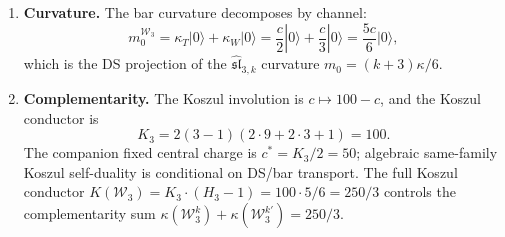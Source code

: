 \begin{theorem}
\begin{enumerate}[label=\textup{(\roman*)}]
\item \textbf{Curvature.} The bar curvature
 decomposes by channel:
 \[
 m_0^{\mathcal{W}_3} = \kappa_T |0\rangle + \kappa_W |0\rangle
 = \frac{c}{2}|0\rangle + \frac{c}{3}|0\rangle
 = \frac{5c}{6}|0\rangle,
 \]
 which is the DS projection of the $\widehat{\mathfrak{sl}}_{3,k}$
 curvature $m_0 = (k{+}3)\kappa/6$.

\item \textbf{Complementarity.}
 The Koszul involution is $c \mapsto 100 - c$,
 and the Koszul conductor is
 \[
 K_3 = 2(3{-}1)(2 \cdot 9 + 2 \cdot 3 + 1) = 100.
 \]
 The companion fixed central charge is $c^* = K_3/2 = 50$; algebraic
 same-family Koszul self-duality is conditional on DS/bar transport.
 The full Koszul conductor
 $K(\mathcal{W}_3) = K_3 \cdot (H_3 - 1) = 100 \cdot 5/6 = 250/3$
 controls the complementarity sum
 $\kappa(\mathcal{W}_3^k) + \kappa(\mathcal{W}_3^{k'}) = 250/3$.
\end{enumerate}
\end{theorem}

